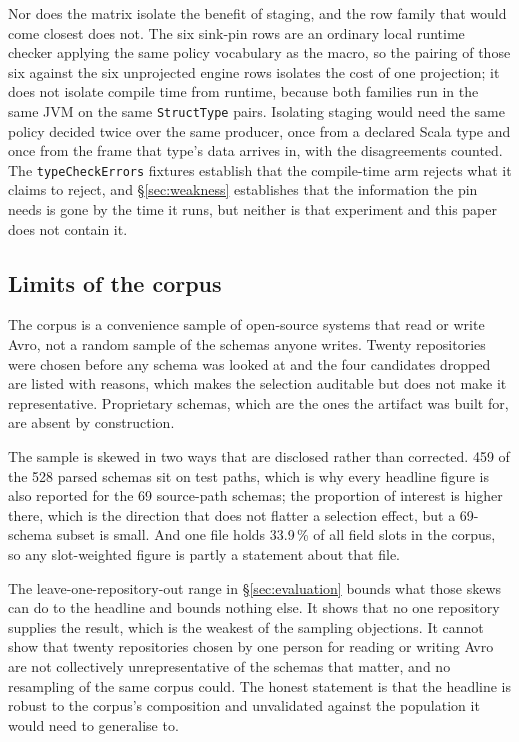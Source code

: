 Nor does the matrix isolate the benefit of staging, and the row family that would come closest does not. The six sink-pin rows are an ordinary local runtime checker applying the same policy vocabulary as the macro, so the pairing of those six against the six unprojected engine rows isolates the cost of one projection; it does not isolate compile time from runtime, because both families run in the same JVM on the same \texttt{StructType} pairs. Isolating staging would need the same policy decided twice over the same producer, once from a declared Scala type and once from the frame that type's data arrives in, with the disagreements counted. The \texttt{typeCheckErrors} fixtures establish that the compile-time arm rejects what it claims to reject, and \S\ref{sec:weakness} establishes that the information the pin needs is gone by the time it runs, but neither is that experiment and this paper does not contain it.

\subsection{Limits of the corpus}
\label{sec:limits-corpus}

The corpus is a convenience sample of open-source systems that read or write Avro, not a random sample of the schemas anyone writes. Twenty repositories were chosen before any schema was looked at and the four candidates dropped are listed with reasons, which makes the selection auditable but does not make it representative. Proprietary schemas, which are the ones the artifact was built for, are absent by construction.

The sample is skewed in two ways that are disclosed rather than corrected. 459 of the 528 parsed schemas sit on test paths, which is why every headline figure is also reported for the 69 source-path schemas; the proportion of interest is higher there, which is the direction that does not flatter a selection effect, but a 69-schema subset is small. And one file holds 33.9\,\% of all field slots in the corpus, so any slot-weighted figure is partly a statement about that file.

The leave-one-repository-out range in \S\ref{sec:evaluation} bounds what those skews can do to the headline and bounds nothing else. It shows that no one repository supplies the result, which is the weakest of the sampling objections. It cannot show that twenty repositories chosen by one person for reading or writing Avro are not collectively unrepresentative of the schemas that matter, and no resampling of the same corpus could. The honest statement is that the headline is robust to the corpus's composition and unvalidated against the population it would need to generalise to.

